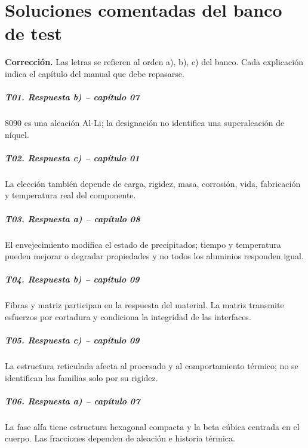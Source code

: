 \chapter{Soluciones comentadas del banco de test}
\label{ch:test-matmo-2026-sol}
\noindent\textbf{Corrección.} Las letras se refieren al orden a), b), c) del banco. Cada explicación indica el capítulo del manual que debe repasarse.

\paragraph{T01. Respuesta b) -- capítulo 07} 8090 es una aleación Al-Li; la designación no identifica una superaleación de níquel.

\paragraph{T02. Respuesta c) -- capítulo 01} La elección también depende de carga, rigidez, masa, corrosión, vida, fabricación y temperatura real del componente.

\paragraph{T03. Respuesta a) -- capítulo 08} El envejecimiento modifica el estado de precipitados; tiempo y temperatura pueden mejorar o degradar propiedades y no todos los aluminios responden igual.

\paragraph{T04. Respuesta b) -- capítulo 09} Fibras y matriz participan en la respuesta del material. La matriz transmite esfuerzos por cortadura y condiciona la integridad de las interfaces.

\paragraph{T05. Respuesta c) -- capítulo 09} La estructura reticulada afecta al procesado y al comportamiento térmico; no se identifican las familias solo por su rigidez.

\paragraph{T06. Respuesta a) -- capítulo 07} La fase alfa tiene estructura hexagonal compacta y la beta cúbica centrada en el cuerpo. Las fracciones dependen de aleación e historia térmica.

